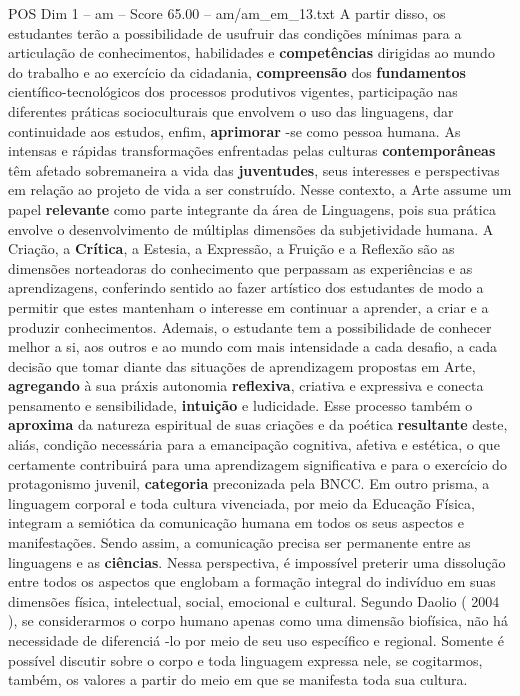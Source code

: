 \begin{textsample}{POS Dim 1 – am – Score 65.00 – am/am\_em\_13.txt}
A partir disso, os estudantes terão a possibilidade de usufruir das condições mínimas para a articulação de conhecimentos, habilidades e \textbf{competências} dirigidas ao mundo do trabalho e ao exercício da cidadania, \textbf{compreensão} dos \textbf{fundamentos} científico-tecnológicos dos processos produtivos vigentes, participação nas diferentes práticas socioculturais que envolvem o uso das linguagens, dar continuidade aos estudos, enfim, \textbf{aprimorar} -se como pessoa humana.
As intensas e rápidas transformações enfrentadas pelas culturas \textbf{contemporâneas} têm afetado sobremaneira a vida das \textbf{juventudes}, seus interesses e perspectivas em relação ao projeto de vida a ser construído.
Nesse contexto, a Arte assume um papel \textbf{relevante} como parte integrante da área de Linguagens, pois sua prática envolve o desenvolvimento de múltiplas dimensões da subjetividade humana.
A Criação, a \textbf{Crítica}, a Estesia, a Expressão, a Fruição e a Reflexão são as dimensões norteadoras do conhecimento que perpassam as experiências e as aprendizagens, conferindo sentido ao fazer artístico dos estudantes de modo a permitir que estes mantenham o interesse em continuar a aprender, a criar e a produzir conhecimentos.
Ademais, o estudante tem a possibilidade de conhecer melhor a si, aos outros e ao mundo com mais intensidade a cada desafio, a cada decisão que tomar diante das situações de aprendizagem propostas em Arte, \textbf{agregando} à sua práxis autonomia \textbf{reflexiva}, criativa e expressiva e conecta pensamento e sensibilidade, \textbf{intuição} e ludicidade.
Esse processo também o \textbf{aproxima} da natureza espiritual de suas criações e da poética \textbf{resultante} deste, aliás, condição necessária para a emancipação cognitiva, afetiva e estética, o que certamente contribuirá para uma aprendizagem significativa e para o exercício do protagonismo juvenil, \textbf{categoria} preconizada pela BNCC.
Em outro prisma, a linguagem corporal e toda cultura vivenciada, por meio da Educação Física, integram a semiótica da comunicação humana em todos os seus aspectos e manifestações.
Sendo assim, a comunicação precisa ser permanente entre as linguagens e as \textbf{ciências}.
Nessa perspectiva, é impossível preterir uma dissolução entre todos os aspectos que englobam a formação integral do indivíduo em suas dimensões física, intelectual, social, emocional e cultural.
Segundo Daolio ( 2004 ), se considerarmos o corpo humano apenas como uma dimensão biofísica, não há necessidade de diferenciá -lo por meio de seu uso específico e regional.
Somente é possível discutir sobre o corpo e toda linguagem expressa nele, se cogitarmos, também, os valores a partir do meio em que se manifesta toda sua cultura.

\end{textsample}
